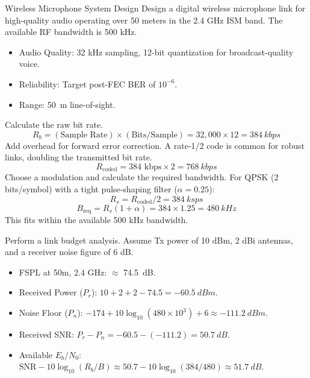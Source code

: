 \begin{workedexample}{Wireless Microphone System Design}
     Design a digital wireless microphone link for high-quality audio operating over 50 meters in the 2.4 GHz ISM band. The available RF bandwidth is 500 kHz.
    
    \begin{itemize}
        \item Audio Quality: 32 kHz sampling, 12-bit quantization for broadcast-quality voice.
        \item Reliability: Target post-FEC BER of $10^{-6}$.
        \item Range: \qty{50}{m} line-of-sight.
    \end{itemize}
    
    \begin{derivationsteps}
        \step Calculate the raw bit rate.
        \[ R_b = (\text{Sample Rate}) \times (\text{Bits/Sample}) = 32,000 \times 12 = \qty{384}{kbps} \]
        \step Add overhead for forward error correction. A rate-1/2 code is common for robust links, doubling the transmitted bit rate.
        \[ R_{\text{coded}} = 384 \text{ kbps} \times 2 = \qty{768}{kbps} \]
        \step Choose a modulation and calculate the required bandwidth. For QPSK (2 bits/symbol) with a tight pulse-shaping filter ($\alpha=0.25$):
        \[ R_s = R_{\text{coded}} / 2 = \qty{384}{ksps} \]
        \[ B_{\text{req}} = R_s (1 + \alpha) = 384 \times 1.25 = \qty{480}{kHz} \]
        This fits within the available 500 kHz bandwidth.
        
        \step Perform a link budget analysis. Assume Tx power of 10 dBm, 2 dBi antennas, and a receiver noise figure of 6 dB.
        \begin{itemize}
            \item FSPL at 50m, 2.4 GHz: $\approx$ \qty{74.5}{dB}.
            \item Received Power ($P_r$): $10 + 2 + 2 - 74.5 = \qty{-60.5}{dBm}$.
            \item Noise Floor ($P_n$): $-174 + 10\log_{10}(480 \times 10^3) + 6 \approx \qty{-111.2}{dBm}$.
            \item Received SNR: $P_r - P_n = -60.5 - (-111.2) = \qty{50.7}{dB}$.
            \item Available $E_b/N_0$: $\text{SNR} - 10\log_{10}(R_b/B) \approx 50.7 - 10\log_{10}(384/480) \approx \qty{51.7}{dB}$.
        \end{itemize}
        

\end{derivationsteps}
\end{workedexample}
